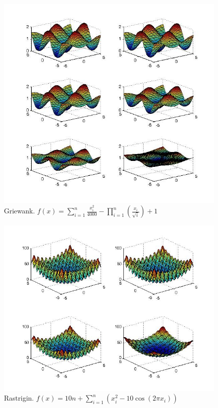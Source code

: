 \documentclass[hyperref={pdfpagelabels=false}]{beamer}
\begin{document}
\begin{frame}
\begin{figure}
\includegraphics[scale=0.32]{smoothgriewank.jpg}
\caption{Griewank. $f(x)=\sum_{i=1}^n\frac{x_i^2}{4000}-\prod_{i=1}^n(\frac{x_i}{\sqrt{i}})+1$}
\end{figure}
\end{frame}


\begin{frame}
\begin{figure}
\includegraphics[scale=0.37]{smoothrast.jpg}
\caption{Rastrigin. $f(x)=10n+\sum_{i=1}^n(x_i^2-10\cos(2\pi x_i))$}
\end{figure}
\end{frame}
\end{document}
